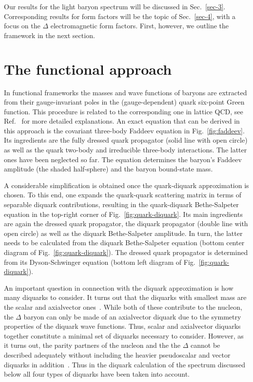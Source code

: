 \documentclass[epj,twocolumn]{webofc}
\begin{document}
Our results for the light baryon spectrum will be discussed in Sec.~\ref{sec-3}. Corresponding
results for form factors will be the topic of Sec.~\ref{sec-4}, with a focus on the $\Delta$ electromagnetic form factors.
First, however, we outline the framework in the next section.

\section{The functional approach}\label{sec-2}

In functional frameworks the masses and wave functions of baryons are extracted from their gauge-invariant
poles in the (gauge-dependent) quark six-point Green function. This procedure is related to the corresponding
one in lattice QCD, see Ref.~\cite{Eichmann:2016yit} for more detailed explanations. An exact equation that can
be derived in this approach is the covariant three-body Faddeev equation in Fig.~\ref{fig:faddeev}.
Its ingredients are the fully dressed quark propagator (solid line with open circle) as well as the quark two-body
and irreducible three-body interactions. The latter ones have been neglected so far. The equation determines the baryon's
Faddeev amplitude (the shaded half-sphere) and the baryon bound-state mass.

A considerable simplification is obtained once the quark-diquark approximation is chosen. To this end,
one expands the quark-quark scattering matrix in terms of separable diquark contributions, resulting
in the quark-diquark Bethe-Salpeter equation in the top-right corner of Fig.~\ref{fig:quark-diquark}.
Its main ingredients are again the dressed quark propagator, the diquark propagator (double line with
open circle) as well as the diquark Bethe-Salpeter amplitude. In turn, the latter needs to be
calculated from the diquark Bethe-Salpeter equation (bottom center diagram of Fig.~\ref{fig:quark-diquark}).
The dressed quark propagator is determined from its Dyson-Schwinger equation (bottom left diagram
of Fig.~\ref{fig:quark-diquark}).

An important question in connection with the diquark approximation is how many diquarks to consider.
It turns out that the diquarks with smallest mass are the scalar and axialvector ones~\cite{Maris:2002yu}. While both
of these contribute to the nucleon, the $\Delta$ baryon can only be made of an axialvector diquark due
to the symmetry properties of the diquark wave functions. Thus, scalar and axialvector diquarks together
constitute a minimal set of diquarks necessary to consider. However, as it turns out, the parity partners
of the nucleon and the the $\Delta$ cannot be described adequately without including the heavier
pseudoscalar and vector diquarks in addition~\cite{Eichmann:2016jqx}. Thus in the diquark calculation of the spectrum discussed
below all four types of diquarks have been taken into account.
\end{document}
